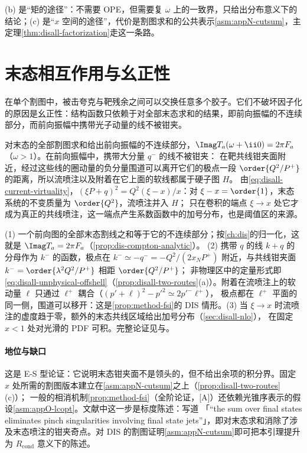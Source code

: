\noindent
(b) 是“矩的途径”：不需要 OPE，但需要复 $\omega$ 上的一致界，只给出分布意义下的结论；(c) 是“$x$ 空间的途径”，代价是割图求和的公共表示\cref{asm:appN-cutsum}，主定理\cref{thm:disall-factorization}走这一条路。
\section{末态相互作用与幺正性}\label{sec:disall-fsi}

在单个割图中，被击夸克与靶残余之间可以交换任意多个胶子。它们不破坏因子化的原因是幺正性：结构函数只依赖于对全部末态求和的结果，即前向振幅的不连续部分，而前向振幅中携带光子动量的线不被钳夹。

\begin{lemma}\label{lem:disall-fsi}
对末态的全部割图求和给出前向振幅的不连续部分，$\Imag T_a(\omega+\ii0)=2\pi F_a$（$\omega>1$）。在前向振幅中，携带大分量 $q^-$ 的线不被钳夹：
在靶共线钳夹面附近，经过这些线的圈动量的负分量围道可以离开它们的极点一段 $\order{Q^2/P^+}$ 的距离，所以流喷注以及附着在它上面的软线都属于硬子图 $H$。
由\cref{eq:disall-current-virtuality}，$(\xi P+q)^2=Q^2(\xi-x)/x$：对 $\xi-x=\order{1}$，末态系统的不变质量为 $\order{Q^2}$，流喷注并入 $H$；
只在卷积的端点 $\xi\to x$ 处它才成为真正的共线喷注，这一端点产生系数函数中的加号分布，也是阈值区的来源。
\end{lemma}

\begin{proofsketch}
(1) 一个前向图的全部末态割线之和等于它的不连续部分；按\cref{ch:dis}的归一化，这就是 $\Imag T_a=2\pi F_a$（\cref{prop:dis-compton-analytic}）。
(2) 携带 $q$ 的线 $k+q$ 的分母作为 $k^-$ 的函数，极点在 $k^-\simeq-q^-=-Q^2/(2x_NP^+)$ 附近，与共线钳夹面 $k^-=\order{\lambda^2Q^2/P^+}$ 相距 $\order{Q^2/P^+}$；
非物理区中的定量形式即\cref{eq:disall-unphysical-offshell}（\cref{prop:disall-two-routes}(a)）。附着在流喷注上的软动量 $\ell$ 只通过 $\ell^+$ 耦合（$(p'+\ell)^2-p'^2\simeq2p'^-\ell^+$），
极点都在 $\ell^+$ 平面的同一侧，围道可以移开：这是\cref{prop:method-fsi}的 DIS 情形。(3) 当 $\xi\to x$ 时流喷注的虚度趋于零，额外的末态共线区域给出加号分布（\cref{sec:disall-nlo}），
在固定 $x<1$ 处对光滑的 PDF 可积。完整论证见\cite[第~8.7~节]{CollinsSoperSterman1989}与\cite{LibbySterman1978a}。
\end{proofsketch}

\paragraph{地位与缺口}
这是 E-S 型论证：它说明末态钳夹面不是领头的，但不给出余项的积分界。固定 $x$ 处所需的割图版本建立在\cref{asm:appN-cutsum}之上（\cref{prop:disall-two-routes}(c)）；
一般的相消机制\cref{prop:method-fsi}（全阶论证，[A]）还依赖光锥序表示的假设\cref{asm:appO-lcopt}。文献中这一步是标度陈述：\cite[第~8.7~节]{CollinsSoperSterman1989}写道
「“the sum over final states eliminates pinch singularities involving final state jets”」，即对末态求和消除了涉及末态喷注的钳夹奇点。对 DIS 的割图证明\cref{asm:appN-cutsum}即可把本引理提升为 $R_{\mathrm{cond}}$ 意义下的陈述。


